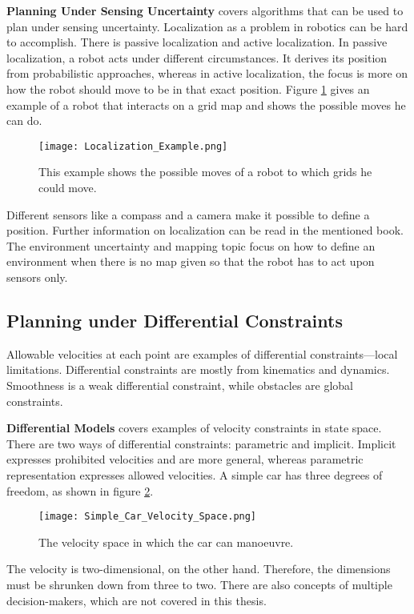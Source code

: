 \textbf{Planning Under Sensing Uncertainty} covers algorithms that can be used to plan under sensing uncertainty. Localization as a problem in robotics can be hard to accomplish. There is passive localization and active localization. In passive localization, a robot acts under different circumstances. It derives its position from probabilistic approaches, whereas in active localization, the focus is more on how the robot should move to be in that exact position. Figure \ref{fig:Localization Example} gives an example of a robot that interacts on a grid map and shows the possible moves he can do. \cite{planning_algorithms_steven_m_lavalle}
\begin{figure}[H]
    \centering
    \texttt{[image: Localization\_Example.png]}
    \caption{This example shows the possible moves of a robot to which grids he could move. \cite{planning_algorithms_steven_m_lavalle}}
    \label{fig:Localization Example}
\end{figure}

Different sensors like a compass and a camera make it possible to define a position. Further information on localization can be read in the mentioned book. The environment uncertainty and mapping topic focus on how to define an environment when there is no map given so that the robot has to act upon sensors only. \cite{planning_algorithms_steven_m_lavalle}

\subsection{Planning under Differential Constraints} \label{sec:Planning under Differential Constraints}
Allowable velocities at each point are examples of differential constraints—local limitations. Differential constraints are mostly from kinematics and dynamics. Smoothness is a weak differential constraint, while obstacles are global constraints.

\textbf{Differential Models} covers examples of velocity constraints in state space. There are two ways of differential constraints: parametric and implicit. Implicit expresses prohibited velocities and are more general, whereas parametric representation expresses allowed velocities. A simple car has three degrees of freedom, as shown in figure \ref{fig:Simple Car Velocity Space}.
\begin{figure}[H]
    \centering
    \texttt{[image: Simple\_Car\_Velocity\_Space.png]}
    \caption{The velocity space in which the car can manoeuvre. \cite{planning_algorithms_steven_m_lavalle}}
    \label{fig:Simple Car Velocity Space}
\end{figure}
The velocity is two-dimensional, on the other hand. Therefore, the dimensions must be shrunken down from three to two. There are also concepts of multiple decision-makers, which are not covered in this thesis.

